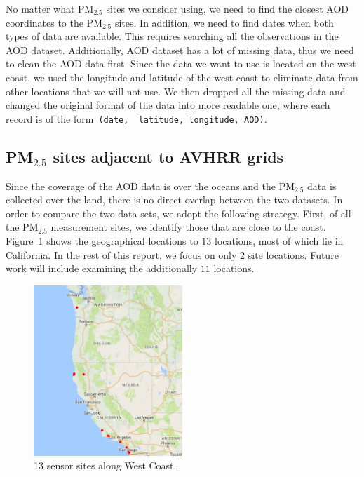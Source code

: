 \documentclass[10pt]{article}
\newcommand{\alennote}[1]{{\color{green}{Alen: {#1}}}}
\begin{document}
No matter what PM$_{2.5}$ sites we consider using, we need to find the closest
AOD coordinates to the PM$_{2.5}$ sites. In addition, we need to find dates
when both types of data are available. This requires searching all the
observations in the AOD dataset. 
Additionally, AOD dataset has a lot of missing data, thus we need
to clean the AOD data first.  Since the data we want to use is located on the
west coast,  we used the longitude and latitude of the west coast to eliminate
data from other locations that we will not use. We then dropped all the missing
data and changed the original format of the data into more readable one, where each record 
is of the form~\verb+(date,  latitude, longitude, AOD)+.



\subsection{PM$_{2.5}$ sites adjacent to AVHRR grids}
Since the coverage of the AOD data is over the oceans and the PM$_{2.5}$ data
is collected over the land, there is no direct overlap between the two
datasets. In order to compare the two data sets, we adopt the following
strategy. First, of all the PM$_{2.5}$ measurement sites, we identify those
that are close to the coast. Figure~\ref{fig:locations} shows the geographical
locations to $13$ locations, most of which lie in California.   In the rest of
this report, we focus on only $2$ site locations. Future work will include
examining the additionally $11$ locations. 

\begin{figure}[H]
\centering
\includegraphics[width=0.5\textwidth]{pm13.png}
\caption{13 sensor sites along West Coast.}
\label{fig:locations}
\end{figure}
\end{document}
